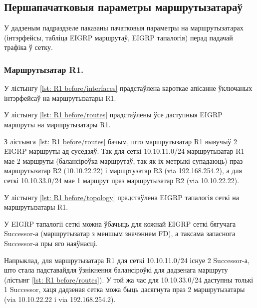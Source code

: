 \subsection{Першапачатковыя параметры маршрутызатараў}

У дадзеным падраздзеле паказаны пачатковыя параметры на маршрутызатарах (інтэрфейсы, табліца EIGRP маршрутаў, EIGRP тапалогія)
перад падачай трафіка ў сетку.

\subsubsection{Маршрутызатар R1.}

У лістынгу \ref{lst: R1 before/interfaces} прадстаўлена кароткае апісанне ўключаных інтэрфейсаў на маршрутызатары R1.



У лістынгу \ref{lst: R1 before/routes} прадстаўлены ўсе даступныя EIGRP маршруты на маршрутызатары R1.




З лістынга \ref{lst: R1 before/routes} бачым, што маршрутызатар R1
вывучыў 2 EIGRP маршруты ад суседзяў.
Так для сеткі 10.10.11.0/24 маршрутызатар R1 мае 2 маршруты (балансіроўка
маршрутаў, так як іх метрыкі супадаюць)
праз маршрутызатар R2 (10.10.22.22) і маршртузатар R3 (via 192.168.254.2),
а для сеткі 10.10.33.0/24 мае 1 маршрут праз маршрутызатар R2 (via 10.10.22.22).

У лістынгу \ref{lst: R1 before/topology} прадстаўлена EIGRP тапалогія сеткі на
маршрутызатары R1.



У EIGRP тапалогіі сеткі можна ўбачыць для кожнай EIGRP сеткі бягучага
Successor-а (маршрутызатар з меншым значэннем FD), а таксама запаснога
Successor-а пры яго наяўнасці.

Напрыклад, для маршрутызатара R1 для сеткі 10.10.11.0/24 існуе 2 Successor-а,
што стала падставайдля ўзнікнення балансіроўкі для дадзенага маршруту
(лістынг \ref{lst: R1 before/routes}).
У той жа час для 10.10.33.0/24 даступны толькі 1 Successor, хаця дадзеная
сетка можа быць дасягнута праз 2 маршрутызатары (via 10.10.22.22 і via 192.168.254.2).


